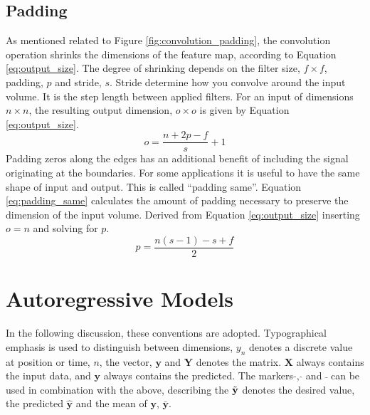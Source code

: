 \subsection{Padding} \label{sec:padding}
As mentioned related to Figure \ref{fig:convolution_padding}, the convolution operation shrinks the dimensions of the feature map, according to Equation \eqref{eq:output_size}. The degree of shrinking depends on the filter size, $f\times f$, padding, $p$ and stride, $s$. Stride determine how you convolve around the input volume. It is the step length between applied filters. For an input of dimensions $n\times n$, the resulting output dimension, $o\times o$ is given by Equation \eqref{eq:output_size}.
\begin{equation} \label{eq:output_size}
    o = \frac{n+2p-f}{s} + 1
\end{equation}
Padding zeros along the edges has an additional benefit of including the signal originating at the boundaries. For some applications it is useful to have the same shape of input and output. This is called ``padding same''. Equation \eqref{eq:padding_same} calculates the amount of padding necessary to preserve the dimension of the input volume. 
Derived from Equation \eqref{eq:output_size} inserting $o=n$ and solving for $p$.
\begin{equation} \label{eq:padding_same}
    p = \frac{n\left(s-1\right)-s+f}{2}
\end{equation}

\section{Autoregressive Models} \label{sec:ARmodels}
In the following discussion, these conventions are adopted. Typographical emphasis is used to distinguish between dimensions, $y_n$ denotes a discrete value at position or time, $n$, the vector, $\mathbf{y}$ and $\mathbf{Y}$ denotes the matrix. $\mathbf{X}$ always contains the input data, and $\mathbf{y}$ always contains the predicted. The markers $\tilde{ }$, $\hat{ }$ and $\bar{ }$ can be used in combination with the above, describing the $\Tilde{\mathbf{y}}$ denotes the desired value, the predicted $\hat{\mathbf{y}}$ and the mean of $\mathbf{y}$, $\bar{\mathbf{y}}$.

